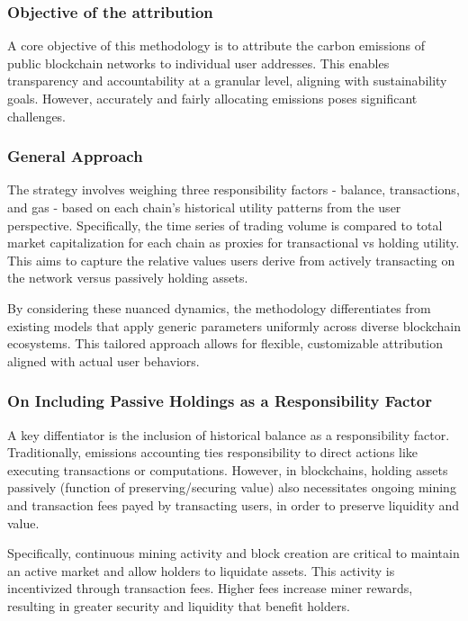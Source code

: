 \documentclass[11pt]{report}
\begin{document}
\subsubsection*{Objective of the attribution}
A core objective of this methodology is to attribute the carbon emissions of public blockchain networks to individual user addresses. This enables transparency and accountability at a granular level, aligning with sustainability goals. However, accurately and fairly allocating emissions poses significant challenges.

\subsubsection{General Approach}
The strategy involves weighing three responsibility factors - balance, transactions, and gas - based on each chain's historical utility patterns from the user perspective. Specifically, the time series of trading volume is compared to total market capitalization for each chain as proxies for transactional vs holding utility. This aims to capture the relative values users derive from actively transacting on the network versus passively holding assets.

By considering these nuanced dynamics, the methodology differentiates from existing models that apply generic parameters uniformly across diverse blockchain ecosystems. This tailored approach allows for flexible, customizable attribution aligned with actual user behaviors.



\subsubsection*{On Including Passive Holdings as a Responsibility Factor}
A key diffentiator is the inclusion of historical balance as a responsibility factor. Traditionally, emissions accounting ties responsibility to direct actions like executing transactions or computations.  However, in blockchains, holding assets passively (function of preserving/securing value) also necessitates ongoing mining and transaction fees payed by transacting users, in order to preserve liquidity and value.


Specifically, continuous mining activity and block creation are critical to maintain an active market and allow holders to liquidate assets. This activity is incentivized through transaction fees. Higher fees increase miner rewards, resulting in greater security and liquidity that benefit holders.
\end{document}
